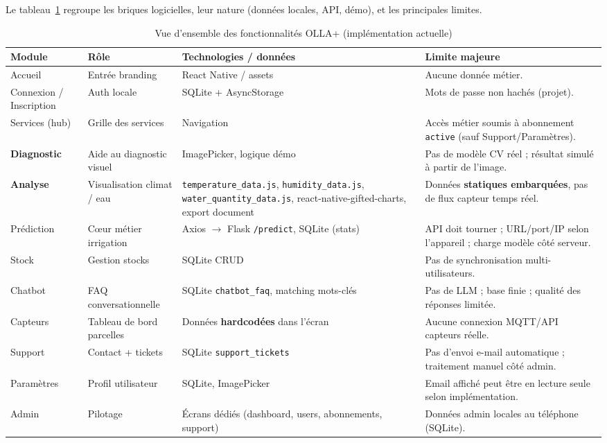 \documentclass[12pt,a4paper,twoside,openright]{report}
\begin{document}
Le tableau~\ref{tab:modules} regroupe les briques logicielles, leur nature (données locales, API, démo), et les principales limites.

\begin{table}[H]
  \centering
  \caption{Vue d'ensemble des fonctionnalités OLLA+ (implémentation actuelle)}
  \label{tab:modules}
  \small
  \begin{tabular}{@{}p{3.1cm}p{3.6cm}p{4.2cm}p{4.4cm}@{}}
    \toprule
    \textbf{Module} & \textbf{Rôle} & \textbf{Technologies / données} & \textbf{Limite majeure} \\
    \midrule
    Accueil & Entrée branding & React Native / assets & Aucune donnée métier. \\
    Connexion / Inscription & Auth locale & SQLite + AsyncStorage & Mots de passe non hachés (projet). \\
    Services (hub) & Grille des services & Navigation & Accès métier soumis à abonnement \texttt{active} (sauf Support/Paramètres). \\
    \textbf{Diagnostic} & Aide au diagnostic visuel & ImagePicker, logique démo & Pas de modèle CV réel ; résultat simulé à partir de l'image. \\
    \textbf{Analyse} & Visualisation climat / eau & \texttt{temperature\_data.js}, \texttt{humidity\_data.js}, \texttt{water\_quantity\_data.js}, react-native-gifted-charts, export document & Données \textbf{statiques embarquées}, pas de flux capteur temps réel. \\
    Prédiction & Cœur métier irrigation & Axios $\rightarrow$ Flask \texttt{/predict}, SQLite (stats) & API doit tourner ; URL/port/IP selon l'appareil ; charge modèle côté serveur. \\
    Stock & Gestion stocks & SQLite CRUD & Pas de synchronisation multi-utilisateurs. \\
    Chatbot & FAQ conversationnelle & SQLite \texttt{chatbot\_faq}, matching mots-clés & Pas de LLM ; base finie ; qualité des réponses limitée. \\
    Capteurs & Tableau de bord parcelles & Données \textbf{hardcodées} dans l'écran & Aucune connexion MQTT/API capteurs réelle. \\
    Support & Contact + tickets & SQLite \texttt{support\_tickets} & Pas d'envoi e-mail automatique ; traitement manuel côté admin. \\
    Paramètres & Profil utilisateur & SQLite, ImagePicker & Email affiché peut être en lecture seule selon implémentation. \\
    Admin & Pilotage & Écrans dédiés (dashboard, users, abonnements, support) & Données admin locales au téléphone (SQLite). \\
    \bottomrule
  \end{tabular}
\end{table}
\end{document}
